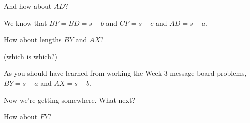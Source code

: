 And how about $AD$?













We know that $BF = BD = s - b$ and $CF = s - c$ and $AD = s - a$.

How about lengths $BY$ and $AX$?

(which is which?)



As you should have learned from working the Week 3 message board problems, $BY = s - a$ and $AX = s - b$.

Now we're getting somewhere. What next?

How about $FY?$



